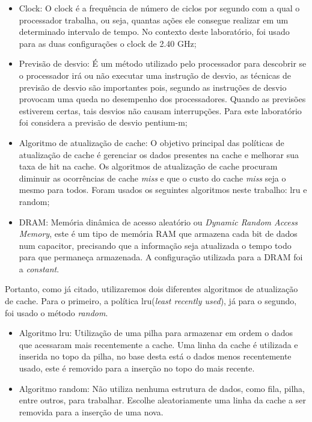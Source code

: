 \documentclass[12pt]{article}
\begin{document}
\begin{itemize}
    \item Clock: O clock é a frequência de número de ciclos por segundo com a qual o processador trabalha, ou seja, quantas ações ele consegue realizar em um determinado intervalo de tempo. No contexto deste laboratório, foi usado para as duas configurações o clock de 2.40 GHz;
    
    \item Previsão de desvio: É um método utilizado pelo processador para descobrir se o processador irá ou não executar uma instrução de desvio, as técnicas de previsão de desvio são importantes pois, segundo \cite{pizzol:05} as instruções de desvio provocam uma queda no desempenho dos processadores. Quando as previsões estiverem certas, tais desvios não causam interrupções. Para este laboratório foi considera a previsão de desvio pentium-m; 
    
    \item Algoritmo de atualização de cache: O objetivo principal das políticas de atualização de cache é gerenciar os dados presentes na cache e melhorar sua taxa de hit na cache. Os algoritmos de atualização de cache procuram diminuir as ocorrências de cache \textit{miss} e que o custo do cache \textit{miss} seja o mesmo para todos. Foram usados os seguintes algoritmos neste trabalho: lru e random;
    
    \item DRAM: Memória dinâmica de acesso aleatório ou \textit{Dynamic Random Access Memory}, este é um tipo de memória RAM que armazena cada bit de dados num capacitor, precisando que a informação seja atualizada o tempo todo para que permaneça armazenada. A configuração utilizada para a DRAM foi a \textit{constant}.
     
\end{itemize}

Portanto, como já citado, utilizaremos dois diferentes algoritmos de atualização de cache. Para o primeiro, a política lru(\textit{least recently used}), já para o segundo, foi usado o método \textit{random}.

\begin{itemize}

    \item Algoritmo lru: Utilização de uma pilha para armazenar em ordem o dados que acessaram mais recentemente a cache. Uma linha da cache é utilizada e inserida no topo da pilha, no base desta está o dados menos recentemente usado, este é removido para a inserção no topo do mais recente.

    \item Algoritmo random: Não utiliza nenhuma estrutura de dados, como fila, pilha, entre outros, para trabalhar. Escolhe aleatoriamente uma linha da cache a ser removida para a inserção de uma nova.

\end{itemize}
\end{document}
